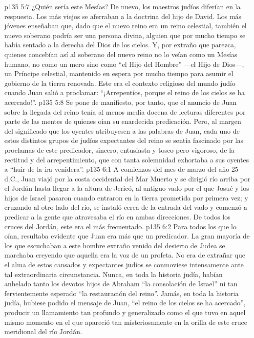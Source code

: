 \vs p135 5:7 ¿Quién sería este Mesías? De nuevo, los maestros judíos diferían en la respuesta. Los más viejos se aferraban a la doctrina del hijo de David. Los más jóvenes enseñaban que, dado que el nuevo reino era un reino celestial, también el nuevo soberano podría ser una persona divina, alguien que por mucho tiempo se había sentado a la derecha del Dios de los cielos. Y, por extraño que parezca, quienes concebían así al soberano del nuevo reino no lo veían como un Mesías humano, no como un mero  sino como “el Hijo del Hombre” ---el Hijo de Dios---, un Príncipe celestial, mantenido en espera por mucho tiempo para asumir el gobierno de la tierra renovada. Este era el contexto religioso del mundo judío cuando Juan salió a proclamar: “¡Arrepentíos, porque el reino de los cielos se ha acercado!”.
\vs p135 5:8 Se pone de manifiesto, por tanto, que el anuncio de Juan sobre la llegada del reino tenía al menos media docena de lecturas diferentes por parte de las mentes de quienes oían su enardecida predicación. Pero, al margen del significado que los oyentes atribuyesen a las palabras de Juan, cada uno de estos distintos grupos de judíos expectantes del reino se sentía fascinado por las proclamas de este predicador, sincero, entusiasta y tosco pero vigoroso, de la rectitud y del arrepentimiento, que con tanta solemnidad exhortaba a sus oyentes a “huir de la ira venidera”.
\vs p135 6:1 A comienzos del mes de marzo del año 25 d.C., Juan viajó por la costa occidental del Mar Muerto y se dirigió río arriba por el Jordán hasta llegar a la altura de Jericó, al antiguo vado por el que Josué y los hijos de Israel pasaron cuando entraron en la tierra prometida por primera vez; y cruzando al otro lado del río, se instaló cerca de la entrada del vado y comenzó a predicar a la gente que atravesaba el río en ambas direcciones. De todos los cruces del Jordán, este era el más frecuentado.
\vs p135 6:2 Para todos los que lo oían, resultaba evidente que Juan era más que un predicador. La gran mayoría de los que escuchaban a este hombre extraño venido del desierto de Judea se marchaba creyendo que aquella era la voz de un profeta. No era de extrañar que el alma de estos cansados y expectantes judíos se conmoviese intensamente ante tal extraordinaria circunstancia. Nunca, en toda la historia judía, habían anhelado tanto los devotos hijos de Abraham “la consolación de Israel” ni tan fervientemente esperado “la restauración del reino”. Jamás, en toda la historia judía, hubiese podido el mensaje de Juan, “el reino de los cielos se ha acercado”, producir un llamamiento tan profundo y generalizado como el que tuvo en aquel mismo momento en el que apareció tan misteriosamente en la orilla de este cruce meridional del río Jordán.
